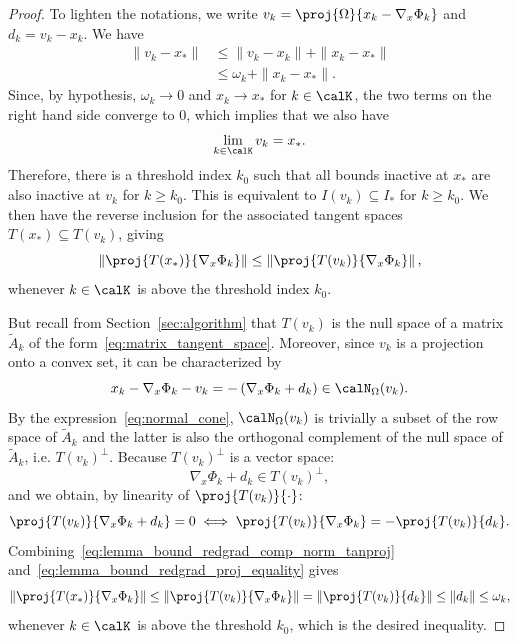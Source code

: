 \begin{proof}
	To lighten the notations, we write $v_k = \proj{\Omega}{x_k - \nabla_x \Phi_k}$ and $d_k = v_k - x_k$. We have
	\begin{equation*}
		\begin{split}
			\|v_k - x_*\| &\le \|v_k - x_k\| + \| x_k - x_*\| \\
			& \le \omega_k + \| x_k - x_*\|.
		\end{split}
	\end{equation*}
	Since, by hypothesis, $\omega_k \to 0$ and $x_k \to x_*$ for $k\in \calK$, the two terms on the right hand side converge to $0$, which implies that we also have
	\begin{equation*}
		\lim\limits_{k \in \calK} v_k = x_*.
	\end{equation*}
	Therefore, there is a threshold index $k_0$ such that all bounds inactive at $x_*$ are also inactive at $v_k$ for $k \ge k_0$. This is equivalent to $I(v_k) \subseteq I_*$ for $k\ge k_0$. We then have the reverse inclusion for the associated tangent spaces $T(x_*) \subseteq T(v_k)$, giving
	\begin{equation}\label{eq:lemma_bound_redgrad_comp_norm_tanproj}
		\left\| \proj{T(x_*)}{\nabla_x \Phi_k} \right\| \le \left\| \proj{T(v_k)}{\nabla_x \Phi_k} \right\|,
	\end{equation}
	whenever $k\in \calK$ is above the threshold index $k_0$.
	
	But recall from Section~\ref{sec:algorithm} that $T(v_k)$ is the null space of a matrix $\tilde A_k$ of the form~\eqref{eq:matrix_tangent_space}. Moreover, since $v_k$ is a projection onto a convex set, it can be characterized by
	\begin{equation*}
	x_k - \nabla_x \Phi_k - v_k = -\left(\nabla_x \Phi_k + d_k\right) \in \calN_\Omega(v_k).
	\end{equation*} 
	By the expression~\eqref{eq:normal_cone}, $\calN_\Omega(v_k)$ is trivially a subset of the row space of $\tilde A_k$ and the latter is also the orthogonal complement of the null space of $\tilde A_k$, i.e.  $T(v_k)^\perp$. 
	Because $T(v_k)^\perp$ is a vector space:
	\[\nabla_x \Phi_k + d_k \in T(v_k)^\perp,\]
	and we obtain, by linearity of $\proj{T(v_k)}{\cdot}$:
	\begin{equation}\label{eq:lemma_bound_redgrad_proj_equality}
		\proj{T(v_k)}{\nabla_x \Phi_k + d_k} = 0 \iff \proj{T(v_k)}{\nabla_x \Phi_k} = -\proj{T(v_k)}{d_k}.
	\end{equation}
	Combining~\eqref{eq:lemma_bound_redgrad_comp_norm_tanproj} and~\eqref{eq:lemma_bound_redgrad_proj_equality} gives
	\begin{equation*}
		\left\| \proj{T(x_*)}{\nabla_x \Phi_k} \right\| \le \left\| \proj{T(v_k)}{\nabla_x \Phi_k} \right\| = \left\| \proj{T(v_k)}{d_k} \right\| \le \|d_k\| \le \omega_k,
	\end{equation*}
	whenever $k \in \calK$ is above the threshold $k_0$, which is the desired inequality.
\end{proof}

